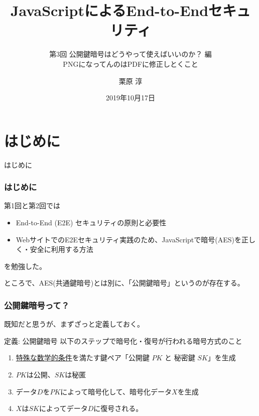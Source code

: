 \documentclass[12pt,dvipdfmx]{beamer}
\title[E2E Security with JS 03]{JavaScriptによるEnd-to-Endセキュリティ}
\subtitle{第3回 公開鍵暗号はどうやって使えばいいのか？ 編\\ \alert{PNGになってんのはPDFに修正しとくこと}}
\author[Jun Kurihara]{栗原 淳}
\institute[]{}
\date[Oct. 17, 2019]{2019年10月17日}
\begin{document}
\begin{frame}
\titlepage
\end{frame}

\section{はじめに}
\begin{frame}
 \centering
 {\Large はじめに}
\end{frame}

\begin{frame}
\frametitle{はじめに}
第1回と第2回では
\begin{itemize}
 \item End-to-End (E2E) セキュリティの原則と必要性
 \item WebサイトでのE2Eセキュリティ実践のため、JavaScriptで暗号(AES)を正しく・安全に利用する方法
\end{itemize}
を勉強した。


\vspace{2ex}

ところで、AES(共通鍵暗号)とは別に、「公開鍵暗号」というのが存在する。
\end{frame}

\begin{frame}
\frametitle{公開鍵暗号って？}

既知だと思うが、まずざっと定義しておく。

\begin{block}{\small 定義: 公開鍵暗号}
\footnotesize
以下のステップで暗号化・復号が行われる暗号方式のこと
\begin{enumerate}
 \item \underline{特殊な数学的条件}を満たす鍵ペア「公開鍵 $\mathit{PK}$ と 秘密鍵 $\mathit{SK}$」を生成
 \item \alert{$\mathit{PK}$は公開、$\mathit{SK}$は秘匿}
 \item データ$D$を$\mathit{PK}$によって暗号化して、暗号化データ$X$を生成
 \item $X$は$\mathit{SK}$によってデータ$D$に復号される。
\end{enumerate}
\end{block}
\end{frame}
\end{document}
